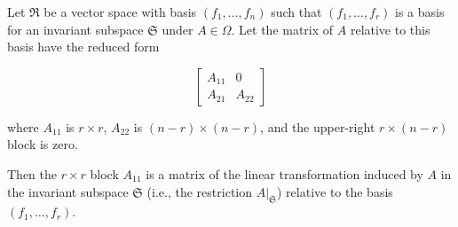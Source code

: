 Let $\Re$ be a vector space with basis $(f_1, \ldots, f_n)$ such that $(f_1, \ldots, f_r)$ is a basis for an invariant subspace $\mathfrak{S}$ under $A \in \Omega$. Let the matrix of $A$ relative to this basis have the reduced form

$$\begin{bmatrix}
A_{11} & 0 \\
A_{21} & A_{22}
\end{bmatrix}$$

where $A_{11}$ is $r \times r$, $A_{22}$ is $(n-r) \times (n-r)$, and the upper-right $r \times (n-r)$ block is zero.

Then the $r \times r$ block $A_{11}$ is a matrix of the linear transformation induced by $A$ in the invariant subspace $\mathfrak{S}$ (i.e., the restriction $A|_{\mathfrak{S}}$) relative to the basis $(f_1, \ldots, f_r)$.
